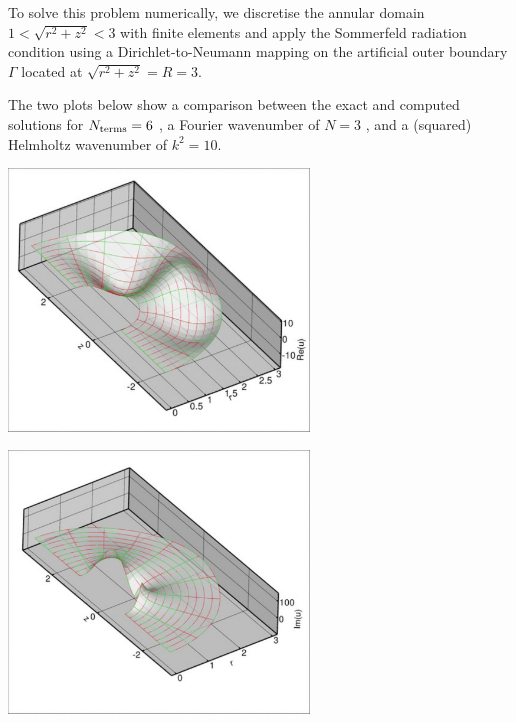 To solve this problem numerically, we discretise the annular domain $ 1 < \sqrt{r^2 + z^2} < 3 $ with finite elements and apply the Sommerfeld radiation condition using a Dirichlet-\/to-\/\+Neumann mapping on the artificial outer boundary $ \Gamma $ located at $ \sqrt{r^2 + z^2} = R = 3$.

The two plots below show a comparison between the exact and computed solutions for $ N_{\rm terms}=6 $ , a Fourier wavenumber of $ N=3 $ , and a (squared) Helmholtz wavenumber of $ k^2 = 10 $.

 
\begin{DoxyImage}
\includegraphics[width=0.6\textwidth]{real}
\end{DoxyImage}


 
\begin{DoxyImage}
\includegraphics[width=0.6\textwidth]{imag}
\end{DoxyImage}




